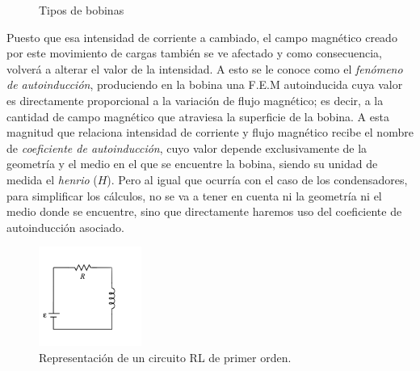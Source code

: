 \documentclass[../main.tex]{subfiles}
\begin{document}
\begin{figure}[!h]
    \centering
    \caption{Tipos de bobinas}
    \label{fig::tipos_bobinas}
\end{figure}

Puesto que esa intensidad de corriente a cambiado, el campo magnético creado por este movimiento de cargas también se ve afectado y como consecuencia, volverá a alterar el valor de la intensidad. A esto se le conoce como el \textit{fenómeno de autoinducción}, produciendo en la bobina una F.E.M autoinducida cuya valor es directamente proporcional a la variación de flujo magnético; es decir, a la cantidad de campo magnético que atraviesa la superficie de la bobina. A esta magnitud que relaciona intensidad de corriente y flujo magnético recibe el nombre de \textit{coeficiente de autoinducción}, cuyo valor depende exclusivamente de la geometría y el medio en el que se encuentre la bobina, siendo su unidad de medida el \textit{henrio} ($H$). Pero al igual que ocurría con el caso de los condensadores, para simplificar los cálculos, no se va a tener en cuenta ni la geometría ni el medio donde se encuentre, sino que directamente haremos uso del coeficiente de autoinducción asociado. \\ 

\begin{figure}[!h]
    \centering
    \includegraphics[width=0.3\textwidth]{images/Circuito_RL.png}
    \caption{Representación de un circuito RL de primer orden.}
    \label{fig::circuito_rL_representación}
\end{figure}
\end{document}
